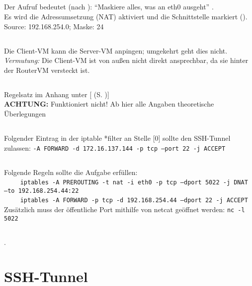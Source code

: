 \documentclass[twoside]{article}
\newcommand{\say}[1]{%
	``#1''%
}
\newcommand{\ttt}[1]{%
	\texttt{#1}%
}
\newcommand{\mref}[1]{[\nameref{#1} (S. \pageref{#1})]}
\begin{document}
	\subsection{}
	\label{ssec:3.1}
	Der Aufruf bedeutet (nach \cite{nat}): \say{Maskiere alles, was an eth0 ausgeht}.\\
	Es wird die Adressumsetzung (NAT) aktiviert und die Schnittstelle markiert (\cite{ubuntu:nat}).\\
	Source: 192.168.254.0; Maske: 24
	\subsection{}
	\label{ssec:3.2}
	Die Client-VM kann die Server-VM anpingen; umgekehrt geht dies nicht.\\
	\textit{Vermutung:} Die Client-VM ist von außen nicht direkt ansprechbar, da sie hinter der RouterVM versteckt ist.
	\subsection{}
	\label{ssec:3.3}
	Regelsatz im Anhang unter \mref{3.3-1}\\
	\textbf{ACHTUNG:} Funktioniert nicht!
	Ab hier alle Angaben theoretische Überlegungen
	\subsection{}
	\label{ssec:3.4}
	Folgender Eintrag in der iptable *filter an Stelle [0] sollte den SSH-Tunnel zulassen: \ttt{-A FORWARD -d 172.16.137.144 -p tcp --port 22 -j ACCEPT}
	\subsection{}
	\label{ssec:3.5}
	Folgende Regeln sollte die Aufgabe erfüllen:\\
	\-~~~~\ttt{iptables -A PREROUTING -t nat -i eth0 -p tcp --dport 5022 -j DNAT --to 192.168.254.44:22}\\
	\-~~~~\ttt{iptables -A FORWARD -p tcp -d 192.168.254.44 --dport 22 -j ACCEPT}\\
	Zusätzlich muss der öffentliche Port mithilfe von netcat geöffnet werden: \ttt{nc -l 5022}
	\subsection{}.
	\label{ssec:3.6}

\section{SSH-Tunnel}
\label{sec:ssh-tunnel}
\end{document}
